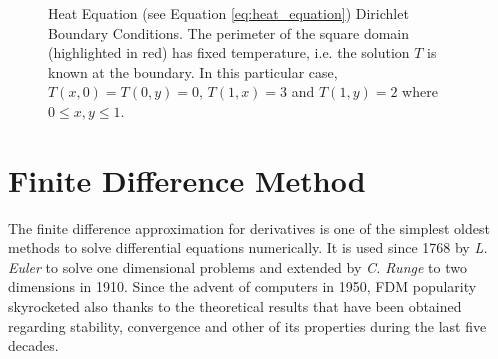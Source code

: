     \begin{center}
	\begin{figure}
    	 \label{fig:heat2d_bc}
    	\caption[Heat Equation - Dirichlet Boundary Conditions]{Heat Equation (see Equation \ref{eq:heat_equation}) Dirichlet Boundary Conditions. The perimeter of the square domain (highlighted in red) has fixed temperature, i.e. the solution $T$ is known at the boundary. In this particular case, $T(x,0)=T(0,y)=0$, $T(1,x)=3$ and $T(1,y)=2$ where $0\leq x,y\leq 1$. }\label{fig:heat2d_bc}
	\end{figure}
\end{center} 

\section{Finite Difference Method}
The finite difference approximation for derivatives is one of the simplest oldest methods to solve differential equations numerically. It is used since 1768 by \textit{L. Euler} to solve one dimensional problems and extended by \textit{C. Runge} to two dimensions in 1910. Since the advent of computers in 1950, FDM  popularity skyrocketed also thanks to the theoretical results that have been obtained regarding stability, convergence and other of its properties during the last five decades.

